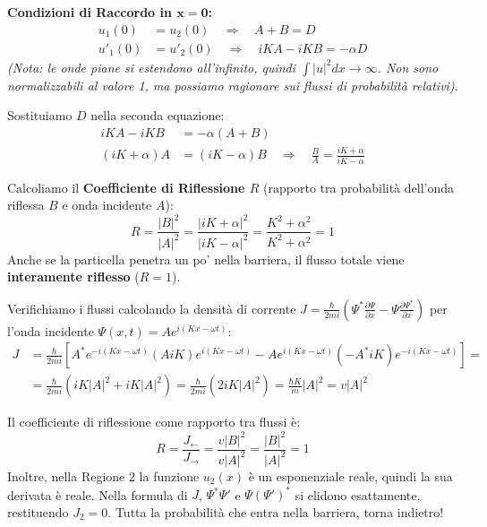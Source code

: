 \documentclass[11pt, a4paper]{article}
\begin{document}
\noindent
\textbf{Condizioni di Raccordo in $\mathbf{x=0}$:} %
\begin{align*}
    u_1(0) &= u_2(0) \quad \Rightarrow \quad A + B = D \\ %
    u'_1(0) &= u'_2(0) \quad \Rightarrow \quad iKA - iKB = -\alpha D %
\end{align*}
\textit{(Nota: le onde piane si estendono all'infinito, quindi $\int |u|^2 dx \to \infty$. Non sono normalizzabili al valore 1, ma possiamo ragionare sui flussi di probabilità relativi)}. %

\noindent
Sostituiamo $D$ nella seconda equazione: %
\begin{align*}
    iKA - iKB &= -\alpha(A + B) \\ %
    (iK + \alpha)A &= (iK - \alpha)B \quad \Rightarrow \quad \frac{B}{A} = \frac{iK + \alpha}{iK - \alpha} %
\end{align*}

\noindent
Calcoliamo il \textbf{Coefficiente di Riflessione $R$} (rapporto tra probabilità dell'onda riflessa $B$ e onda incidente $A$): %
\begin{equation}
    \boxed{ R = \frac{|B|^2}{|A|^2} = \frac{|iK + \alpha|^2}{|iK - \alpha|^2} = \frac{K^2 + \alpha^2}{K^2 + \alpha^2} = 1 } %
\end{equation}
Anche se la particella penetra un po' nella barriera, il flusso totale viene \textbf{interamente riflesso} ($R=1$). %

\noindent
Verifichiamo i flussi calcolando la densità di corrente $J = \frac{\hbar}{2mi} \left( \Psi^* \frac{\partial \Psi}{\partial x} - \Psi \frac{\partial \Psi^*}{\partial x} \right)$ per l'onda incidente $\Psi(x,t) = A e^{i(Kx - \omega t)}$: %
\begin{align*}
    J &= \frac{\hbar}{2mi} \left[ A^* e^{-i(Kx - \omega t)} (A i K) e^{i(Kx - \omega t)} - A e^{i(Kx - \omega t)} (-A^* i K) e^{-i(Kx - \omega t)} \right] = \\ %
      &= \frac{\hbar}{2mi} \left( i K |A|^2 + i K |A|^2 \right) = \frac{\hbar}{2mi} (2 i K |A|^2) = \frac{\hbar K}{m} |A|^2 = v |A|^2 %
\end{align*}

Il coefficiente di riflessione come rapporto tra flussi è: %
\begin{equation*}
    R = \frac{J_{\leftarrow}}{J_{\rightarrow}} = \frac{v |B|^2}{v |A|^2} = \frac{|B|^2}{|A|^2} = 1 %
\end{equation*}
Inoltre, nella Regione 2 la funzione $u_2(x)$ è un esponenziale reale, quindi la sua derivata è reale. Nella formula di $J$, $\Psi^* \Psi'$ e $\Psi (\Psi')^*$ si elidono esattamente, restituendo $J_2 = 0$. Tutta la probabilità che entra nella barriera, torna indietro! %
\end{document}
